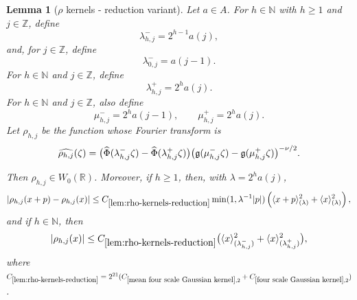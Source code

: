\documentclass[12pt,reqno]{amsart}
\theoremstyle{plain}
\newtheorem{lemma}[theorem]{Lemma}
\numberwithin{equation}{section}
\theoremstyle{remark}
\newcommand{\uses}[1]{}
\newcommand{\usesdefs}[1]{}
\newcommand{\Z}{{\mathbb Z}}
\newcommand{\N}{{\mathbb N}}
\begin{document}
\begin{lemma}[$\rho$ kernels - reduction variant] \label{lem:rho-kernels-reduction}\uses{mean four scale Gaussian kernel,standard bump properties,four scale Gaussian kernel}\usesdefs{gaussian,bracket bump,auto:Wiener-space-definition,multiplicatively spaced monotone sequences,standard bump}  Let $a\in A$. For $h\in\N$ with $h\ge1$ and $j\in\Z$, define
\begin{equation}\label{auto:rho-lambda-scales}
\lambda_{h,j}^-=2^{h-1}a(j),
\end{equation}
and, for $j\in\Z$, define
\begin{equation}\label{auto:rho-lambda-zero-scale}
\lambda_{0,j}^-=a(j-1).
\end{equation}
For $h\in\N$ and $j\in\Z$, define
\begin{equation}\label{auto:rho-lambda-upper-scale}
\lambda_{h,j}^+=2^ha(j).
\end{equation}
For $h\in\N$ and $j\in\Z$, also define
\begin{equation}\label{auto:rho-mu-scales}
\mu_{h,j}^-=2^ha(j-1),
\qquad
\mu_{h,j}^+=2^ha(j).
\end{equation}
Let \(\rho_{h,j}\) be the function whose Fourier transform is
\begin{equation}\label{auto:rho-kernel-Fourier-transform}
\widehat{\rho_{h,j}}(\zeta)
=
\bigl(
\widehat\Phi(\lambda_{h,j}^-\zeta)
-
\widehat\Phi(\lambda_{h,j}^+\zeta)
\bigr)
\bigl(
\mathfrak{g}(\mu_{h,j}^-\zeta)
-
\mathfrak{g}(\mu_{h,j}^+\zeta)
\bigr)^{-\nu/2}.
\end{equation}

Then \(\rho_{h,j}\in W_0(\mathbb R)\). Moreover, if \(h\geq1\), then, with $\lambda=2^ha(j)$,
\begin{equation}
    \label{E:increase-data-rho-mean-estimate}
    |\rho_{h,j}(x+p)-\rho_{h,j}(x)|
    \leq
    C_{\ref{lem:rho-kernels-reduction}}
    \min(1,\lambda^{-1}|p|)
    \left(
    \langle x+p\rangle_{(\lambda)}^2
    +
    \langle x\rangle_{(\lambda)}^2
    \right),
\end{equation}
and if $h\in \N$, then
\begin{equation}
    \label{E:increase-data-rho-zero-estimate}
    |\rho_{h,j}(x)|
    \leq
    C_{\ref{lem:rho-kernels-reduction}}
    \big(
    \langle x\rangle_{(\lambda_{h,j}^-)}^2
    +
    \langle x\rangle_{(\lambda_{h,j}^+)}^2
    \big),
\end{equation}
where $C_{\ref{lem:rho-kernels-reduction}} = 2^{21} (C_{\ref{mean four scale Gaussian kernel},2}+C_{\ref{four scale Gaussian kernel},2})$.
\end{lemma}
\end{document}
